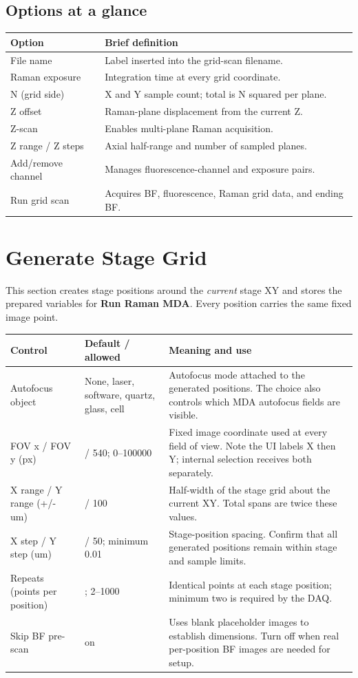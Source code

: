 \documentclass[11pt,oneside]{report}
\makeatletter
\newcommand{\ui}[1]{\textbf{#1}}
\newcommand{\fieldtable}{\begin{longtable}{@{}>{\raggedright\arraybackslash}p{0.25\textwidth}>{\raggedright\arraybackslash}p{0.18\textwidth}>{\raggedright\arraybackslash}p{0.50\textwidth}@{}}\toprule\textbf{Control} & \textbf{Default / allowed} & \textbf{Meaning and use}\\\midrule\endhead}
\newcommand{\finishfieldtable}{\bottomrule\end{longtable}}
\makeatother
\begin{document}
\section*{Options at a glance}
\begin{longtable}{@{}p{}p{}@{}}
\toprule\textbf{Option} & \textbf{Brief definition}\\\midrule
File name & Label inserted into the grid-scan filename.\\
Raman exposure & Integration time at every grid coordinate.\\
N (grid side) & X and Y sample count; total is N squared per plane.\\
Z offset & Raman-plane displacement from the current Z.\\
Z-scan & Enables multi-plane Raman acquisition.\\
Z range / Z steps & Axial half-range and number of sampled planes.\\
Add/remove channel & Manages fluorescence-channel and exposure pairs.\\
Run grid scan & Acquires BF, fluorescence, Raman grid data, and ending BF.\\
\bottomrule\end{longtable}

\chapter{Generate Stage Grid}

This section creates stage positions around the \emph{current} stage XY and stores
the prepared variables for \ui{Run Raman MDA}.
Every position carries the same fixed image point.

\fieldtable
Autofocus object & None, laser, software, quartz, glass, cell & Autofocus mode attached
to the generated positions. The choice also controls which MDA autofocus fields are visible.\\
FOV x / FOV y (px) & 740 / 540; 0--100000 & Fixed image coordinate used at every
field of view. Note the UI labels X then Y; internal selection receives both separately.\\
X range / Y range (+/- um) & 100 / 100 & Half-width of the stage grid about the
current XY. Total spans are twice these values.\\
X step / Y step (um) & 50 / 50; minimum 0.01 & Stage-position spacing. Confirm
that all generated positions remain within stage and sample limits.\\
Repeats (points per position) & 2; 2--1000 & Identical points at each stage position;
minimum two is required by the DAQ.\\
Skip BF pre-scan & on & Uses blank placeholder images to establish dimensions. Turn
off when real per-position BF images are needed for setup.\\
\finishfieldtable
\end{document}
